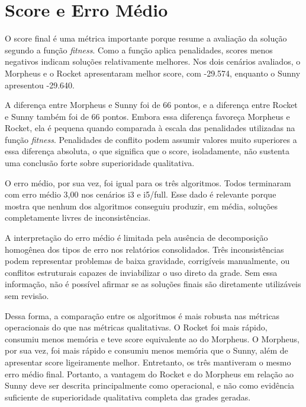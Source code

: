 \section{Score e Erro Médio}
\label{sec:score-erro-medio}

O score final é uma métrica importante porque resume a avaliação da solução segundo a função \textit{fitness}. Como a função aplica penalidades, scores menos negativos indicam soluções relativamente melhores. Nos dois cenários avaliados, o Morpheus e o Rocket apresentaram melhor score, com -29.574, enquanto o Sunny apresentou -29.640.

A diferença entre Morpheus e Sunny foi de 66 pontos, e a diferença entre Rocket e Sunny também foi de 66 pontos. Embora essa diferença favoreça Morpheus e Rocket, ela é pequena quando comparada à escala das penalidades utilizadas na função \textit{fitness}. Penalidades de conflito podem assumir valores muito superiores a essa diferença absoluta, o que significa que o score, isoladamente, não sustenta uma conclusão forte sobre superioridade qualitativa.

O erro médio, por sua vez, foi igual para os três algoritmos. Todos terminaram com erro médio 3,00 nos cenários i3 e i5/full. Esse dado é relevante porque mostra que nenhum dos algoritmos conseguiu produzir, em média, soluções completamente livres de inconsistências.

A interpretação do erro médio é limitada pela ausência de decomposição homogênea dos tipos de erro nos relatórios consolidados. Três inconsistências podem representar problemas de baixa gravidade, corrigíveis manualmente, ou conflitos estruturais capazes de inviabilizar o uso direto da grade. Sem essa informação, não é possível afirmar se as soluções finais são diretamente utilizáveis sem revisão.

Dessa forma, a comparação entre os algoritmos é mais robusta nas métricas operacionais do que nas métricas qualitativas. O Rocket foi mais rápido, consumiu menos memória e teve score equivalente ao do Morpheus. O Morpheus, por sua vez, foi mais rápido e consumiu menos memória que o Sunny, além de apresentar score ligeiramente melhor. Entretanto, os três mantiveram o mesmo erro médio final. Portanto, a vantagem do Rocket e do Morpheus em relação ao Sunny deve ser descrita principalmente como operacional, e não como evidência suficiente de superioridade qualitativa completa das grades geradas.
